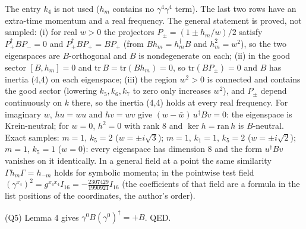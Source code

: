 \documentclass[11pt]{article}
\begin{document}
The entry $k_4$ is not used ($h_m$ contains no $\gamma^4\gamma^4$ term). The last two rows have an extra-time momentum and a real frequency. The general statement is proved, not sampled: (i) for real $w > 0$ the projectors $P_\pm = (1 \pm h_m/w)/2$ satisfy $P_+^\dagger BP_- = 0$ and $P_+^\dagger BP_+ = BP_+$ (from $Bh_m = h_m^\dagger B$ and $h_m^2 = w^2$), so the two eigenspaces are $B$-orthogonal and $B$ is nondegenerate on each; (ii) in the good sector $[B, h_m] = 0$ and $\mathrm{tr}\,B = \mathrm{tr}(Bh_m) = 0$, so $\mathrm{tr}(BP_\pm) = 0$ and $B$ has inertia (4,4) on each eigenspace; (iii) the region $w^2 > 0$ is connected and contains the good sector (lowering $k_5, k_6, k_7$ to zero only increases $w^2$), and $P_\pm$ depend continuously on $k$ there, so the inertia (4,4) holds at every real frequency. For imaginary $w$, $h u = wu$ and $hv = wv$ give $(w - \bar w)\,u^\dagger Bv = 0$: the eigenspace is Krein-neutral; for $w = 0$, $h^2 = 0$ with rank 8 and $\ker h = \mathrm{ran}\,h$ is $B$-neutral. Exact samples: $m = 1$, $k_5 = 2$ ($w = \pm i\sqrt3$); $m = 1$, $k_1 = 1$, $k_5 = 2$ ($w = \pm i\sqrt2$); $m = 1$, $k_5 = 1$ ($w = 0$): every eigenspace has dimension 8 and the form $u^\dagger Bv$ vanishes on it identically. In a general field at a point the same similarity $\Gamma h_m\Gamma = h_{-m}$ holds for symbolic momenta; in the pointwise test field $(\gamma^{x_4})^2 = g^{x_4x_4}I_{16} = -\frac{2307429}{1990921}I_{16}$ (the coefficients of that field are a formula in the list positions of the coordinates, the author's order).

(Q5) Lemma 4 gives $\gamma^0B(\gamma^0)^\dagger = +B$. QED.
\end{document}
